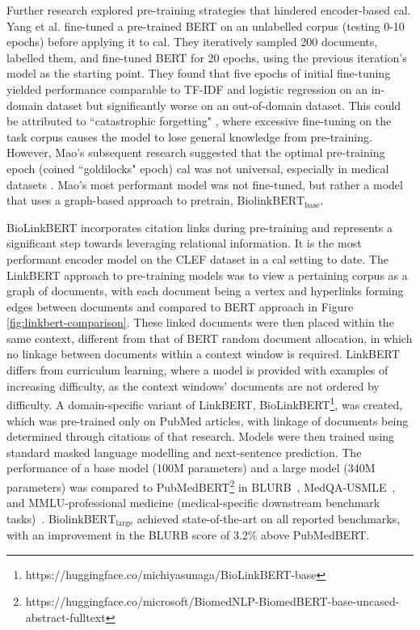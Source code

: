 \documentclass[10pt,oneside]{book}
\begin{document}
Further research explored pre-training strategies that hindered encoder-based \gls*{cal}. Yang et al. \cite{yang_goldilocks_2022} fine-tuned a pre-trained BERT on an unlabelled corpus (testing 0-10 epochs) before applying it to \gls*{cal}. They iteratively sampled 200 documents, labelled them, and fine-tuned BERT for 20 epochs, using the previous iteration's model as the starting point. They found that five epochs of initial fine-tuning yielded performance comparable to TF-IDF and logistic regression on an in-domain dataset but significantly worse on an out-of-domain dataset. This could be attributed to ``catastrophic forgetting" \cite{xu_forget_2020}, where excessive fine-tuning on the task corpus causes the model to lose general knowledge from pre-training. However, Mao's subsequent research suggested that the optimal pre-training epoch (coined ``goldilocks" epoch) \gls*{cal} was not universal, especially in medical datasets \cite{mao_reproducibility_2024}. Mao's most performant model was not fine-tuned, but rather a model that uses a graph-based approach to pretrain, ${\text{BiolinkBERT}}_{\text{base}}$.

BioLinkBERT incorporates citation links during pre-training and represents a significant step towards leveraging relational information. It is the most performant encoder model on the CLEF dataset in a \gls*{cal} setting to date. The LinkBERT approach to pre-training models was to view a pertaining corpus as a graph of documents, with each document being a vertex and hyperlinks forming edges between documents \cite{yasunaga_linkbert_2022} and compared to BERT approach in Figure \ref{fig:linkbert-comparison}. These linked documents were then placed within the same context, different from that of BERT random document allocation, in which no linkage between documents within a context window is required. LinkBERT differs from curriculum learning, where a model is provided with examples of increasing difficulty, as the context windows' documents are not ordered by difficulty. A domain-specific variant of LinkBERT, BioLinkBERT\footnote{https://huggingface.co/michiyasunaga/BioLinkBERT-base}, was created, which was pre-trained only on PubMed articles, with linkage of documents being determined through citations of that research. Models were then trained using standard masked language modelling and next-sentence prediction. The performance of a base model (100M parameters) and a large model (340M parameters) was compared to PubMedBERT\footnote{https://huggingface.co/microsoft/BiomedNLP-BiomedBERT-base-uncased-abstract-fulltext} in BLURB~\cite{gu_domain-specific_2021}, MedQA-USMLE~\cite{jin_what_2021}, and MMLU-professional medicine (medical-specific downstream benchmark tasks)~\cite{hendrycks_measuring_2021}. ${\text{BiolinkBERT}}_{\text{large}}$ achieved state-of-the-art on all reported benchmarks, with an improvement in the BLURB score of 3.2\% above PubMedBERT.
\end{document}
